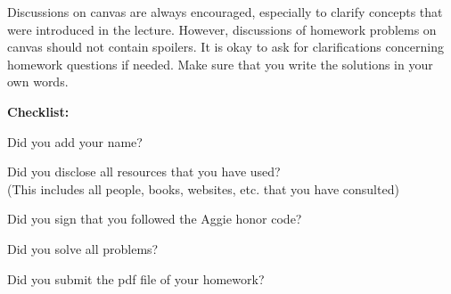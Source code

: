 \documentclass{article}
\theoremstyle{definition}
\newcommand{\checklist}{\noindent\textbf{Checklist:}
\begin{compactitem}[$\Box$] 
\item Did you add your name? 
\item Did you disclose all resources that you have used? \\
(This includes all people, books, websites, etc. that you have consulted)
\item Did you sign that you followed the Aggie honor code? 
\item Did you solve all problems? 
\item Did you submit the pdf file of your homework?
\end{compactitem}
}
\begin{document}
Discussions on canvas are always encouraged, especially to clarify
concepts that were introduced in the lecture. However, discussions of
homework problems on canvas should not contain spoilers. It is okay to
ask for clarifications concerning homework questions if needed. Make
sure that you write the solutions in your own words. 


\medskip



\goodbreak
\checklist
\end{document}
